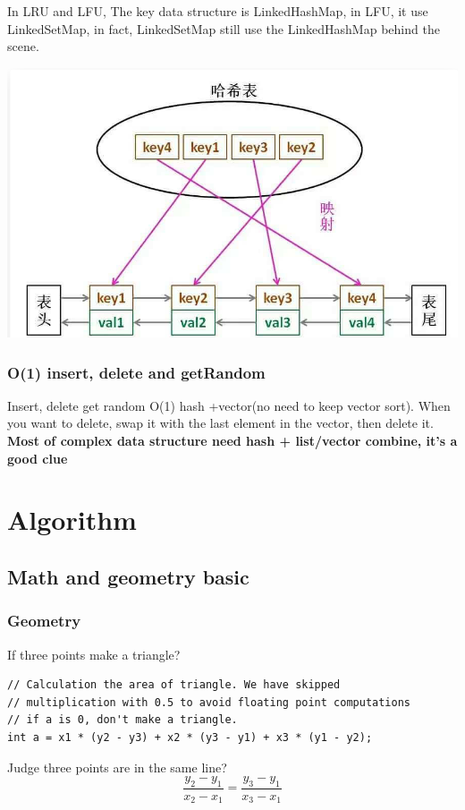 \documentclass[a4paper,11pt,twoside]{book}
\begin{document}
	\par In LRU and LFU, The key data structure is LinkedHashMap, in LFU, it use LinkedSetMap, in fact, LinkedSetMap still use the LinkedHashMap behind the scene. 
\begin{center}
	\includegraphics[width=0.7\linewidth]{pics/LinkedHashMap}
\end{center}
	
	
\subsection{O(1) insert, delete and getRandom}
Insert, delete get random O(1)  hash +vector(no need to keep vector sort). When you want to delete, swap it with the last element in the vector, then delete it.  \textbf{Most of complex data structure need hash + list/vector combine, it's a good clue}
	

\chapter{Algorithm}
\section{Math and geometry basic}
\subsection{Geometry}

	\par If three points make a triangle?
\begin{lstlisting}
// Calculation the area of triangle. We have skipped
// multiplication with 0.5 to avoid floating point computations
// if a is 0, don't make a triangle.
int a = x1 * (y2 - y3) + x2 * (y3 - y1) + x3 * (y1 - y2);
\end{lstlisting}

	\par Judge three points are in the same line?
\[
\dfrac{y_{2}-y_{1}}{x_{2}-x_{1}}  = \dfrac{y_{3}-y_{1}}{x_{3}-x_{1}}
\]
\end{document}
